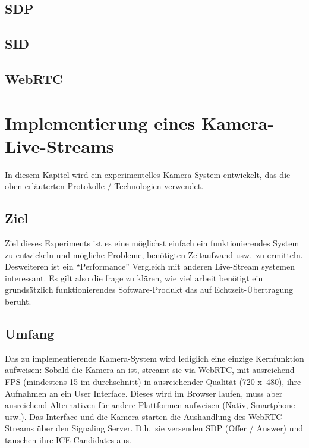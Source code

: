 \documentclass{IEEEtran}
\begin{document}
\begin{twocolumn}
\subsection{SDP}
\subsection{SID}
\subsection{WebRTC}

\section{Implementierung eines Kamera-Live-Streams}

In diesem Kapitel wird ein experimentelles Kamera-System entwickelt, das die
oben erläuterten Protokolle / Technologien verwendet.

\subsection{Ziel}
Ziel dieses Experiments ist es eine möglichst einfach ein funktionierendes
System zu entwickeln und mögliche Probleme, benötigten Zeitaufwand usw.\ zu
ermitteln.  Desweiteren ist ein ``Performance'' Vergleich mit anderen
Live-Stream systemen interessant. Es gilt also die frage zu klären, wie viel
arbeit benötigt ein grundsätzlich funktionierendes Software-Produkt das auf
Echtzeit-Übertragung beruht.

\subsection{Umfang}

Das zu implementierende Kamera-System wird lediglich eine einzige Kernfunktion
aufweisen: Sobald die Kamera an ist, streamt sie via WebRTC, mit ausreichend
FPS (mindestens 15 im durchschnitt) in ausreichender Qualität (720 x\ 480),
ihre Aufnahmen an ein User Interface. Dieses wird im Browser laufen, muss aber
ausreichend Alternativen für andere Plattformen aufweisen (Nativ, Smartphone
usw.). Das Interface und die Kamera starten die Aushandlung des
WebRTC-Streams über den Signaling Server. D.h.\ sie versenden SDP (Offer /
Answer) und tauschen ihre ICE-Candidates aus.


\end{twocolumn}
\end{document}
